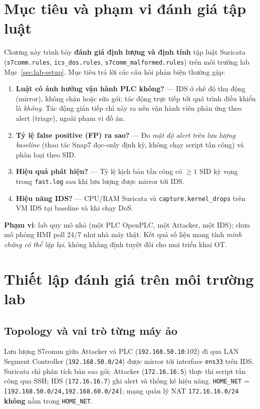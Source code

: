 \documentclass[../main.tex]{subfiles}
\begin{document}
\section{Mục tiêu và phạm vi đánh giá tập luật}
\label{sec:eval-objectives}

Chương này trình bày \textbf{đánh giá định lượng và định tính} tập luật Suricata (\texttt{s7comm.rules}, \texttt{ics\_dos.rules}, \texttt{s7comm\_malformed.rules}) trên môi trường lab Mục~\ref{sec:lab-setup}. Mục tiêu trả lời các câu hỏi phản biện thường gặp:

\begin{enumerate}
    \item \textbf{Luật có ảnh hưởng vận hành PLC không?} --- IDS ở chế độ thụ động (mirror), không chặn hoặc sửa gói; tác động trực tiếp tới quá trình điều khiển là \emph{không}. Tác động gián tiếp chỉ xảy ra nếu vận hành viên phản ứng theo alert (triage), ngoài phạm vi đồ án.
    \item \textbf{Tỷ lệ false positive (FP) ra sao?} --- Đo \emph{mật độ alert trên lưu lượng baseline} (thao tác Snap7 đọc-only định kỳ, không chạy script tấn công) và phân loại theo SID.
    \item \textbf{Hiệu quả phát hiện?} --- Tỷ lệ kịch bản tấn công có $\geq 1$ SID kỳ vọng trong \texttt{fast.log} sau khi lưu lượng được mirror tới IDS.
    \item \textbf{Hiệu năng IDS?} --- CPU/RAM Suricata và \texttt{capture.kernel\_drops} trên VM IDS tại baseline và khi chạy DoS.
\end{enumerate}

\textbf{Phạm vi}: lab quy mô nhỏ (một PLC OpenPLC, một Attacker, một IDS); chưa mô phỏng HMI poll 24/7 như nhà máy thật. Kết quả số liệu mang tính \emph{minh chứng có thể lặp lại}, không khẳng định tuyệt đối cho mọi triển khai OT.

\section{Thiết lập đánh giá trên môi trường lab}
\label{sec:eval-setup}

\subsection{Topology và vai trò từng máy ảo}

Lưu lượng S7comm giữa Attacker và PLC (\texttt{192.168.50.10}:102) đi qua LAN Segment Controller (\texttt{192.168.50.0/24}) được mirror tới interface \texttt{ens33} trên IDS. Suricata chỉ phân tích bản sao gói; Attacker (\texttt{172.16.16.5}) thực thi script tấn công qua SSH; IDS (\texttt{172.16.16.7}) ghi alert và thống kê hiệu năng. \texttt{HOME\_NET} = \texttt{[192.168.50.0/24,192.168.60.0/24]}; mạng quản lý NAT \texttt{172.16.16.0/24} \textbf{không} nằm trong \texttt{HOME\_NET}.
\end{document}
